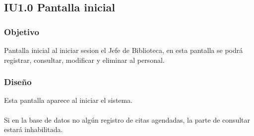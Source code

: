 \newpage
\subsection{IU1.0 Pantalla inicial}

\subsubsection{Objetivo}
	Pantalla inicial al iniciar sesion el Jefe de Biblioteca, en esta pantalla se podrá registrar, consultar, modificar y eliminar al personal.  

\subsubsection{Diseño}
	Esta pantalla aparece al iniciar el sistema.  \\\\
	Si en la base de datos no algún registro de citas agendadas, la parte de consultar estará inhabilitada.

